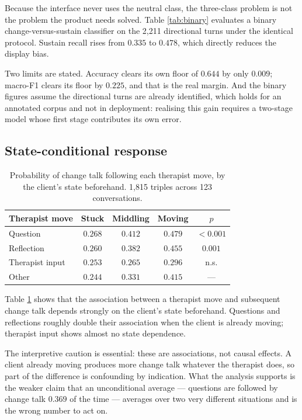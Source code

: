 \documentclass[conference]{IEEEtran}
\begin{document}
Because the interface never uses the neutral class, the three-class problem is
not the problem the product needs solved. Table \ref{tab:binary} evaluates a
binary change-versus-sustain classifier on the 2{,}211 directional turns under
the identical protocol. Sustain recall rises from $0.335$ to $0.478$, which
directly reduces the display bias.

Two limits are stated. Accuracy clears its own floor of $0.644$ by only
$0.009$; macro-F1 clears its floor by $0.225$, and that is the real margin.
And the binary figures assume the directional turns are already identified,
which holds for an annotated corpus and not in deployment: realising this gain
requires a two-stage model whose first stage contributes its own error.

\subsection{State-conditional response}

\begin{table}[t]
\caption{Probability of change talk following each therapist move, by the
client's state beforehand. 1{,}815 triples across 123 conversations.}
\label{tab:state}
\centering
\footnotesize
\begin{tabular}{lcccc}
\toprule
Therapist move & Stuck & Middling & Moving & $p$ \\
\midrule
Question         & $0.268$ & $0.412$ & $0.479$ & $<0.001$ \\
Reflection       & $0.260$ & $0.382$ & $0.455$ & $0.001$ \\
Therapist input  & $0.253$ & $0.265$ & $0.296$ & n.s. \\
Other            & $0.244$ & $0.331$ & $0.415$ & --- \\
\bottomrule
\end{tabular}
\end{table}

Table \ref{tab:state} shows that the association between a therapist move and
subsequent change talk depends strongly on the client's state beforehand.
Questions and reflections roughly double their association when the client is
already moving; therapist input shows almost no state dependence.

The interpretive caution is essential: these are associations, not causal
effects. A client already moving produces more change talk whatever the
therapist does, so part of the difference is confounding by indication. What
the analysis supports is the weaker claim that an unconditional average ---
questions are followed by change talk $0.369$ of the time --- averages over two
very different situations and is the wrong number to act on.
\end{document}
